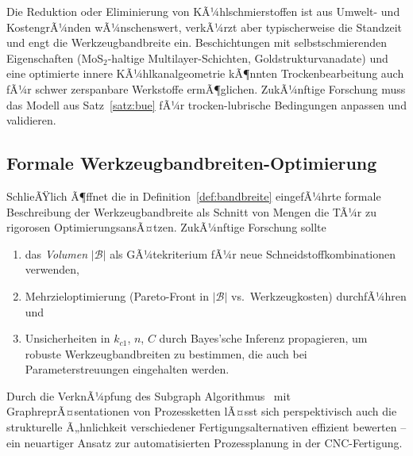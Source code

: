 ﻿\documentclass[a4paper,12pt]{article}
\theoremstyle{definition}
\begin{document}
Die Reduktion oder Eliminierung von KÃ¼hlschmierstoffen ist aus
Umwelt- und KostengrÃ¼nden wÃ¼nschenswert, verkÃ¼rzt aber typischerweise die
Standzeit und engt die Werkzeugbandbreite ein. Beschichtungen mit
selbstschmierenden Eigenschaften (MoS$_2$-haltige Multilayer-Schichten,
Goldstrukturvanadate) und eine optimierte innere KÃ¼hlkanalgeometrie kÃ¶nnten
Trockenbearbeitung auch fÃ¼r schwer zerspanbare Werkstoffe ermÃ¶glichen.
ZukÃ¼nftige Forschung muss das Modell aus Satz~\ref{satz:bue} fÃ¼r
trocken-lubrische Bedingungen anpassen und validieren.

\subsection{Formale Werkzeugbandbreiten-Optimierung}

SchlieÃŸlich Ã¶ffnet die in Definition~\ref{def:bandbreite} eingefÃ¼hrte
formale Beschreibung der Werkzeugbandbreite als Schnitt von Mengen die TÃ¼r
zu rigorosen OptimierungsansÃ¤tzen. ZukÃ¼nftige Forschung sollte

\begin{enumerate}
  \item das \emph{Volumen} $|\mathcal{B}|$ als GÃ¼tekriterium fÃ¼r neue
        Schneidstoffkombinationen verwenden,
  \item Mehrzieloptimierung (Pareto-Front in $|\mathcal{B}|$ vs.\ Werkzeugkosten)
        durchfÃ¼hren und
  \item Unsicherheiten in $k_{c1}$, $n$, $C$ durch Bayes'sche Inferenz
        propagieren, um robuste Werkzeugbandbreiten zu bestimmen, die auch
        bei Parameterstreuungen eingehalten werden.
\end{enumerate}

Durch die VerknÃ¼pfung des Subgraph Algorithmus~\cite{epp2026subgraph} mit
GraphreprÃ¤sentationen von Prozessketten lÃ¤sst sich perspektivisch auch die
strukturelle Ã„hnlichkeit verschiedener Fertigungsalternativen effizient
bewerten -- ein neuartiger Ansatz zur automatisierten Prozessplanung in der
CNC-Fertigung.
\end{document}
